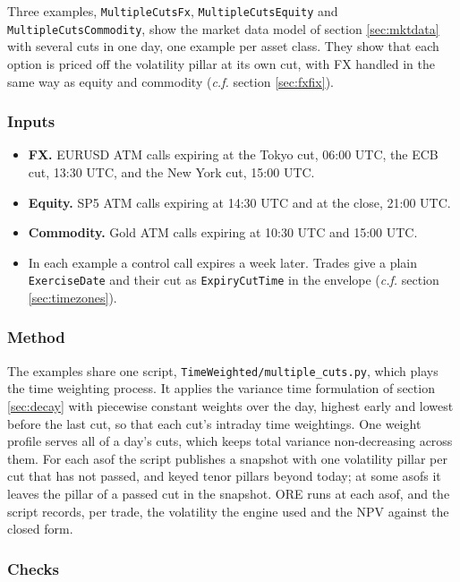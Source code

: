 \documentclass[12pt, a4paper]{article}
\begin{document}
Three examples, \texttt{MultipleCutsFx}, \texttt{MultipleCutsEquity} and \texttt{MultipleCutsCommodity}, show the
market data model of section \ref{sec:mktdata} with several cuts in one day, one example per asset class. They show that
each option is priced off the volatility pillar at its own cut, with FX handled in the same way as equity and
commodity (\textit{c.f.} section \ref{sec:fxfix}).

\subsubsection*{Inputs}

\begin{itemize}
\item \textbf{FX.} EURUSD ATM calls expiring at the Tokyo cut, 06:00 UTC, the ECB cut, 13:30 UTC, and the New York cut,
  15:00 UTC.
\item \textbf{Equity.} SP5 ATM calls expiring at 14:30 UTC and at the close, 21:00 UTC.
\item \textbf{Commodity.} Gold ATM calls expiring at 10:30 UTC and 15:00 UTC.
\item In each example a control call expires a week later. Trades give a plain \texttt{ExerciseDate} and their cut as
  \texttt{ExpiryCutTime} in the envelope (\textit{c.f.} section \ref{sec:timezones}).
\end{itemize}

\subsubsection*{Method}

The examples share one script, \texttt{TimeWeighted/multiple\_cuts.py}, which plays the time weighting process. It applies the
variance time formulation of section \ref{sec:decay} with piecewise constant weights over the day, highest early and
lowest before the last cut, so that each cut's intraday time weightings. One weight profile serves all of a day's cuts, which
keeps total variance non-decreasing across them. For each asof the script publishes a snapshot with one volatility
pillar per cut that has not passed, and keyed tenor pillars beyond today; at some asofs it leaves the pillar of a passed
cut in the snapshot. ORE runs at each asof, and the script records, per trade, the volatility the engine used and the
NPV against the closed form.

\subsubsection*{Checks}
\end{document}
